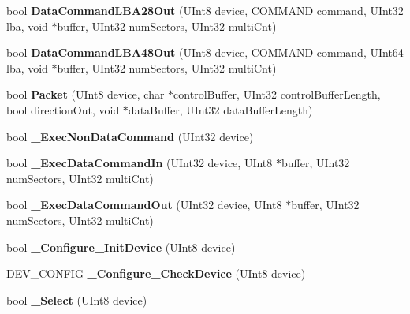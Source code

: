 \begin{DoxyCompactItemize}
bool {\bfseries Data\+Command\+L\+B\+A28\+Out} (U\+Int8 device, C\+O\+M\+M\+A\+ND command, U\+Int32 lba, void $\ast$buffer, U\+Int32 num\+Sectors, U\+Int32 multi\+Cnt)
\item 
\mbox{\label{class_a_t_a_driver_a4ce19d0707488daebbc1c920359580dd}} 
bool {\bfseries Data\+Command\+L\+B\+A48\+Out} (U\+Int8 device, C\+O\+M\+M\+A\+ND command, U\+Int64 lba, void $\ast$buffer, U\+Int32 num\+Sectors, U\+Int32 multi\+Cnt)
\item 
\mbox{\label{class_a_t_a_driver_a62fe17dec81c828ef93ff588801b0624}} 
bool {\bfseries Packet} (U\+Int8 device, char $\ast$control\+Buffer, U\+Int32 control\+Buffer\+Length, bool direction\+Out, void $\ast$data\+Buffer, U\+Int32 data\+Buffer\+Length)
\item 
\mbox{\label{class_a_t_a_driver_a3170301817f7d44bc202e4e326aaec00}} 
bool {\bfseries \+\_\+\+Exec\+Non\+Data\+Command} (U\+Int32 device)
\item 
\mbox{\label{class_a_t_a_driver_a1b0854d1ed7a43e16cb9d0c3274652de}} 
bool {\bfseries \+\_\+\+Exec\+Data\+Command\+In} (U\+Int32 device, U\+Int8 $\ast$buffer, U\+Int32 num\+Sectors, U\+Int32 multi\+Cnt)
\item 
\mbox{\label{class_a_t_a_driver_a4ce795695fe10ccd25ef837b75574c5a}} 
bool {\bfseries \+\_\+\+Exec\+Data\+Command\+Out} (U\+Int32 device, U\+Int8 $\ast$buffer, U\+Int32 num\+Sectors, U\+Int32 multi\+Cnt)
\item 
\mbox{\label{class_a_t_a_driver_ab4e1ce0fdce3f184d016cb79c31a5770}} 
bool {\bfseries \+\_\+\+Configure\+\_\+\+Init\+Device} (U\+Int8 device)
\item 
\mbox{\label{class_a_t_a_driver_adc6ea8fed5cbf4fca899dde0e9fadf32}} 
D\+E\+V\+\_\+\+C\+O\+N\+F\+IG {\bfseries \+\_\+\+Configure\+\_\+\+Check\+Device} (U\+Int8 device)
\item 
\mbox{\label{class_a_t_a_driver_a7d2626a7abf37076b39e1042571d7075}} 
bool {\bfseries \+\_\+\+Select} (U\+Int8 device)
\item 
\mbox{\label{class_a_t_a_driver_a97fd5077fcc89d5abef66326170f47a1}} 

\end{DoxyCompactItemize}
